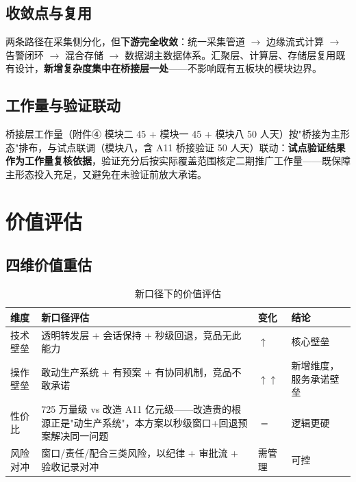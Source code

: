 \documentclass[11pt,a4paper]{ctexart}
\begin{document}
\subsection{收敛点与复用}

两条路径在采集侧分化，但\textbf{下游完全收敛}：统一采集管道 $\rightarrow$ 边缘流式计算 $\rightarrow$ 告警闭环 $\rightarrow$ 混合存储 $\rightarrow$ 数据湖主数据体系。汇聚层、计算层、存储层复用既有设计，\textbf{新增复杂度集中在桥接层一处}——不影响既有五板块的模块边界。

\subsection{工作量与验证联动}

桥接层工作量（附件④ 模块二 45 + 模块一 45 + 模块八 50 人天）按"桥接为主形态"排布，与试点联调（模块八，含 A11 桥接验证 50 人天）联动：\textbf{试点验证结果作为工作量复核依据}，验证充分后按实际覆盖范围核定二期推广工作量——既保障主形态投入充足，又避免在未验证前放大承诺。

\section{价值评估}

\subsection{四维价值重估}

\begin{table}[H]\centering
\caption{新口径下的价值评估}
\begin{tabular}{p{2.6cm} p{5.6cm} p{2.6cm} p{2.0cm}}
\toprule
\textbf{维度} & \textbf{新口径评估} & \textbf{变化} & \textbf{结论} \\
\midrule
技术壁垒 & 透明转发层 + 会话保持 + 秒级回退，竞品无此能力 & $\uparrow$ & 核心壁垒 \\
操作壁垒 & 敢动生产系统 + 有预案 + 有协同机制，竞品不敢承诺 & $\uparrow\uparrow$ & 新增维度，服务承诺壁垒 \\
性价比 & 725 万量级 vs 改造 A11 亿元级——改造贵的根源正是"动生产系统"，本方案以秒级窗口+回退预案解决同一问题 & $=$ & 逻辑更硬 \\
风险对冲 & 窗口/责任/配合三类风险，以纪律 + 审批流 + 验收记录对冲 & 需管理 & 可控 \\
\bottomrule
\end{tabular}
\end{table}
\end{document}
